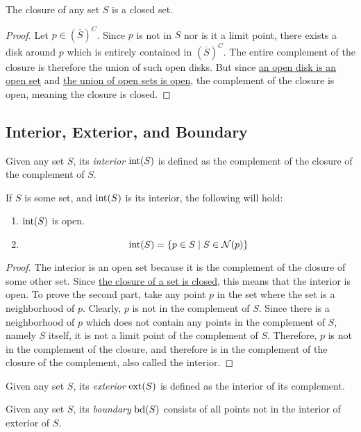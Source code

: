 \begin{lemma}
The closure of any set $S$ is a closed set.
\end{lemma}
\begin{proof}
Let $p \in \left(\overline{S}\right)^C$. Since $p$ is not in $S$ nor is it a limit point, there exists a disk around $p$ which is entirely contained in $\left(\overline{S}\right)^C$. The entire complement of the closure is therefore the union of such open disks. But since \hyperlink{Open Disks are Open Sets}{an open disk is an open set} and \hyperlink{Properties of Open Sets}{the union of open sets is open}, the complement of the closure is open, meaning the closure is closed.
\end{proof}
\subsection{Interior, Exterior, and Boundary}
\begin{definition}
Given any set $S$, its \emph{interior} $\operatorname{int}({S})$ is defined as the complement of the closure of the complement of $S$.
\end{definition}
\begin{lemma}
If $S$ is some set, and $\operatorname{int}({S})$ is its interior, the following will hold:
\begin{enumerate}
\item $\operatorname{int}({S})$ is open.
\item \begin{equation*} \operatorname{int}({S}) = \{p \in S \mid S \in \operatorname{\mathcal{N}}({p})\}\end{equation*}
\end{enumerate}
\end{lemma}
\begin{proof}
The interior is an open set because it is the complement of the closure of some other set. Since \hyperlink{Closure of a Set}{the closure of a set is closed}, this means that the interior is open.
To prove the second part, take any point $p$ in the set where the set is a neighborhood of $p$. Clearly, $p$ is not in the complement of $S$. Since there is a neighborhood of $p$ which does not contain any points in the complement of $S$, namely $S$ itself, it is not a limit point of the complement of $S$. Therefore, $p$ is not in the complement of the closure, and therefore is in the complement of the closure of the complement, also called the interior.
\end{proof}
\begin{definition}
Given any set $S$, its \emph{exterior} $\operatorname{ext}({S})$ is defined as the interior of its complement.
\end{definition}
\begin{definition}
Given any set $S$, its \emph{boundary} $\operatorname{bd}({S})$ consists of all points not in the interior of exterior of $S$.
\end{definition}
